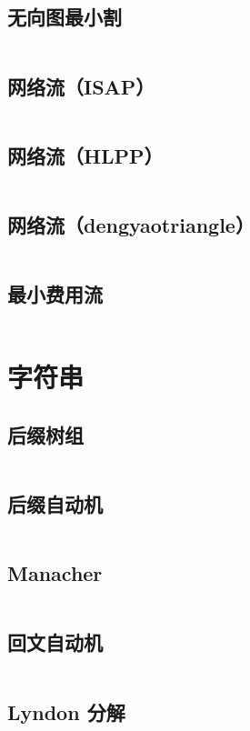 \documentclass[a4paper,9]{article}
\begin{document}
\subsection{无向图最小割}
\inputminted[breaklines,breakanywhere]{c++}{source/graph/mincut.cpp}
\subsection{网络流（ISAP）}
\inputminted[breaklines]{c++}{source/graph/isap.cpp}
\subsection{网络流（HLPP）}
\inputminted[breaklines]{c++}{source/graph/hlpp.cpp}
\subsection{网络流（dengyaotriangle）}
\inputminted[breaklines]{c++}{source/graph/dengyaotriangle.cpp}
\subsection{最小费用流}
\inputminted[breaklines,breakanywhere]{c++}{source/graph/mincost.cpp}

\section{字符串}
\subsection{后缀树组}
\inputminted[breaklines]{c++}{source/string/sa.cpp}
\subsection{后缀自动机}
\inputminted[breaklines]{c++}{source/string/sam.cpp}
\subsection{Manacher}
\inputminted[breaklines]{c++}{source/string/manacher.cpp}
\subsection{回文自动机}
\inputminted[breaklines]{c++}{source/string/pam.cpp}
\subsection{Lyndon 分解}
\inputminted[breaklines]{c++}{source/string/lyndon.cpp}
\end{document}
